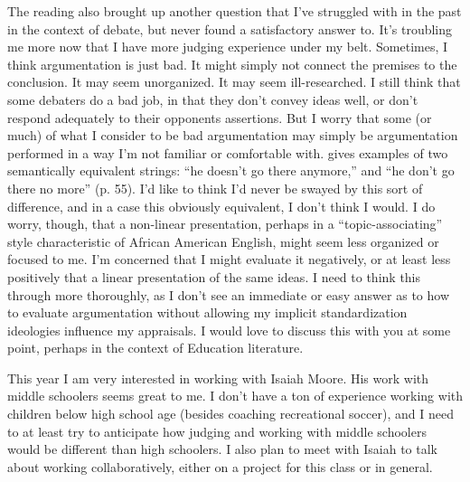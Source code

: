 \documentclass[man,12pt]{apa6}
\begin{document}
The reading also brought up another question that I've struggled with in the
past in the context of debate, but never found a satisfactory answer to. It's
troubling me more now that I have more judging experience under my belt.
Sometimes, I think argumentation is just bad. It might simply not connect the
premises to the conclusion. It may seem unorganized. It may seem
ill-researched. I still think that some debaters do a bad job, in that they
don't convey ideas well, or don't respond adequately to their opponents
assertions. But I worry that some (or much) of what I consider to be bad
argumentation may simply be argumentation performed in a way I'm not familiar
or comfortable with. 
 gives examples of two semantically equivalent strings:
``he doesn't go there anymore,'' and ``he don't go there no more'' (p. 55).
I'd like to think I'd never be swayed by this sort of difference, and in a case
this obviously equivalent, I don't think I would. I do worry, though, that a
non-linear presentation, perhaps in a ``topic-associating''
\cite[p.~102]{CharityHudley10} style characteristic of African American
English, might seem less organized or focused to me. I'm concerned that I might
evaluate it negatively, or at least less positively that a linear presentation
of the same ideas. 
I need to think this through more thoroughly, as I don't see an immediate or
easy answer as to how to evaluate argumentation without allowing my implicit
standardization ideologies influence my appraisals. I would love to discuss
this with you at some point, perhaps in the context of Education literature. 

This year I am very interested in working with Isaiah Moore. His work with
middle schoolers seems great to me. 
I don't have a ton of experience working with children below high school age
(besides coaching recreational soccer), and I need to at least try to
anticipate how judging and working with middle schoolers would be different
than high schoolers. I also plan to meet with Isaiah to talk about working
collaboratively, either on a project for this class or in general. 

\clearpage



\end{document}
